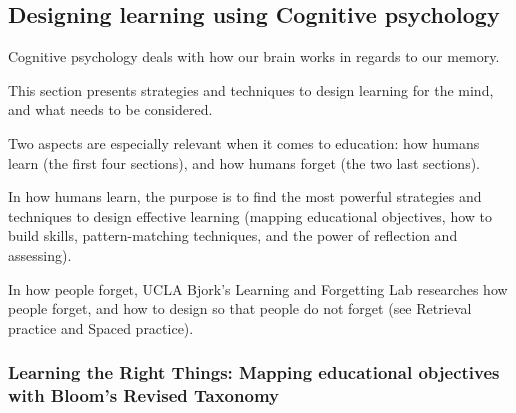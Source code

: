 


%

\subsection{Designing learning using Cognitive psychology}

Cognitive psychology deals with how our brain works in regards to our memory.

This section presents strategies and techniques to design learning for the mind, and what needs to be considered.

Two aspects are especially relevant when it comes to education: how humans learn (the first four sections), and how humans forget (the two last sections).

In how humans learn, the purpose is to find the most powerful strategies and techniques to design effective learning (mapping educational objectives, how to build skills, pattern-matching techniques, and the power of reflection and assessing).

In how people forget, UCLA Bjork's Learning and Forgetting Lab \cite{ucla} researches how people forget, and how to design so that people do not forget (see Retrieval practice and Spaced practice).


  \subsubsection{Learning the Right Things: Mapping educational objectives with Bloom's Revised Taxonomy}

